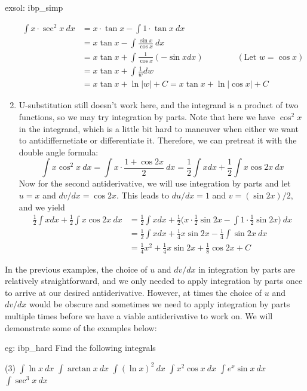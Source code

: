 \begin{exsol}[]{exsol: ibp_simp}
\begin{enumerate}
        \begin{align*}
            \int x \cdot \sec^2x~dx &= x \cdot \tan x - \int 1 \cdot \tan x~dx\\
            &= x \tan x - \int \frac{\sin x}{\cos x}~dx\\
            &= x \tan x + \int \frac{1}{\cos x} (-\sin x dx) \qquad \qquad (\text{Let }w = \cos x)\\
            &= x \tan x + \int \frac{1}{w} dw\\
            &= x \tan x + \ln |w| + C = x\tan x + \ln |\cos x| + C
        \end{align*}
        \item U-substitution still doesn't work here, and the integrand is a product of two functions, so we may try integration by parts.  Note that here we have $\cos^2x$ in the integrand, which is a little bit hard to maneuver when either we want to antidiffernetiate or differentiate it.  Therefore, we can pretreat it with the double angle formula:
        \[\int x \cos^2x~dx = \int x \cdot \frac{1+\cos 2x}{2}~ dx = \frac{1}{2}\int x dx +\frac{1}{2} \int x \cos 2x~dx\]
        Now for the second antiderivative, we will use integration by parts and let $u = x$ and $dv/dx = \cos 2x$.  This leads to $du/dx = 1$ and $v = (\sin 2x)/2$, and we yield
        \begin{align*}
            \frac{1}{2}\int x dx +\frac{1}{2} \int x \cos 2x~dx &= \frac{1}{2}\int x dx + \frac{1}{2}\Big(x \cdot \frac{1}{2}\sin 2x - \int 1 \cdot \frac{1}{2}\sin 2x\Big)~dx\\
            &= \frac{1}{2}\int x dx + \frac{1}{4}x\sin 2x - \frac{1}{4}\int \sin 2x~dx\\
            &= \frac{1}{4}x^2 + \frac{1}{4}x\sin 2x + \frac{1}{8} \cos 2x + C
        \end{align*}
    \end{enumerate}
\end{exsol}

In the previous examples, the choice of $u$ and $dv/dx$ in integration by parts are relatively straightforward, and we only needed to apply integration by parts once to arrive at our desired antiderivative.  However, at times the choice of $u$ and $dv/dx$ would be obscure and sometimes we need to apply integration by parts multiple times before we have a viable antiderivative to work on.  We will demonstrate some of the examples below:

\begin{eg}[]{eg: ibp_hard}
    Find the following integrals
    \begin{tasks}(3)
        \task $\int \ln x~dx$
        \task $\int \arctan x~dx$
        \task $\int (\ln x)^2~dx$
        \task $\int x^2 \cos x~dx$
        \task $\int e^x \sin x~dx$
        \task $\int \sec^3 x~dx$
    \end{tasks}
\end{eg}

